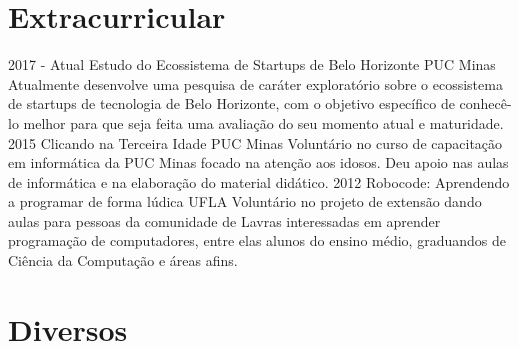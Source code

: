 \documentclass[a4paper]{cv-style}
\begin{document}

\section{Extracurricular}

  \begin{entrylist}
    \entry
    {2017 - Atual}
    {Estudo do Ecossistema de Startups de Belo Horizonte}
    {PUC Minas}
    {Atualmente desenvolve uma pesquisa de caráter exploratório sobre o ecossistema de startups de tecnologia de Belo Horizonte, com o objetivo específico de conhecê-lo melhor para que seja feita uma avaliação do seu momento atual e maturidade.}
    \entry
    {2015}
    {Clicando na Terceira Idade}
    {PUC Minas}
    {Voluntário no curso de capacitação em informática da PUC Minas focado na atenção aos idosos. Deu apoio nas aulas de informática e na elaboração do material didático.}
    \entry
    {2012}
    {Robocode: Aprendendo a programar de forma lúdica}
    {UFLA}
    {Voluntário no projeto de extensão dando aulas para pessoas da comunidade de Lavras interessadas em aprender programação de computadores, entre elas alunos do ensino médio, graduandos de Ciência da Computação e áreas afins.}
    
  \end{entrylist}
\section{Diversos}
\hspace*{1mm}
\begin{minipage}{\linewidth}
\end{minipage}

\end{document}
